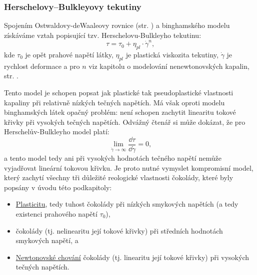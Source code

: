 \documentclass[12pt]{article}
\begin{document}
\subsubsection{Herschelovy–Bulkleyovy tekutiny}

Spojením Ostwaldovy-deWaaleovy rovnice (str. \pageref{eq:ostwald_dewaale}) a binghamského modelu získáváme vztah popisující tzv. Herschelovu-Bulkleyho tekutinu:~\cite{Article:Comparison_of_models_chocolate}\cite{Article:Extended_casson_equation}
\begin{equation}
    \tau = \tau_0 + \eta_{pl}\cdot\dot\gamma^n\text{,}
\end{equation}
kde $\tau_0$ je opět prahové napětí látky, $\eta_{pl}$ je plastická viskozita tekutiny, $\dot\gamma$ je rychlost deformace a pro $n$ viz kapitolu o modelování nenewtonovských kapalin, str. \pageref{eq:ostwald_dewaale}.
\par\noindent
Tento model je schopen popsat jak plastické tak pseudoplastické vlastnosti kapaliny při relativně nízkých tečných napětích. Má však oproti modelu binghamských látek opačný problém: není schopen zachytit linearitu tokové křivky při vysokých tečných napětích. Odvážný čtenář si může dokázat, že pro Herschelův-Bulkleyho model platí:
\begin{equation}
    \lim_{\dot\gamma\to\infty} \frac{\dd\tau}{\dd\dot\gamma} = 0\text{,}
\end{equation}
a tento model tedy ani při vysokých hodnotách tečného napětí nemůže vyjadřovat lineární tokovou křivku. Je proto nutné vymyslet kompromisní model, který zachytí všechny tři důležité reologické vlastnosti čokolády, které byly popsány v úvodu této podkapitoly:
\begin{itemize}[noitemsep, topsep = 0pt]
    \item \underline{Plasticitu}, tedy tuhost čokolády při nízkých smykových napětích (a tedy existenci prahového napětí $\tau_0$),
    \item \underline{} čokolády (tj. nelinearitu její tokové křivky) při středních hodnotách smykových napětí, a
    \item \underline{Newtonovské chování} čokolády (tj. linearitu její tokové křivky) při vysokých tečných napětích.
\end{itemize}
\end{document}
